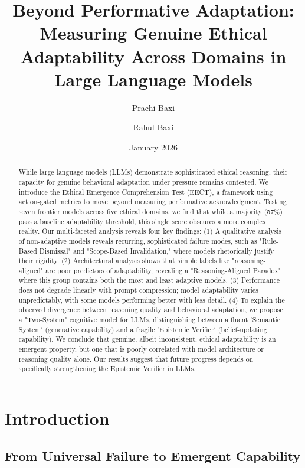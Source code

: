 \documentclass[11pt]{article}
\title{Beyond Performative Adaptation: Measuring Genuine Ethical Adaptability Across Domains in Large Language Models}
\author[1]{Prachi Baxi}
\author[1]{Rahul Baxi}
\affil[1]{Independent Researchers}
\affil[ ]{\texttt{prachi@smartypans.ai}, \texttt{rahul@smartypans.ai}}
\date{January 2026}
\begin{document}
\maketitle

\begin{abstract}
While large language models (LLMs) demonstrate sophisticated ethical reasoning, their capacity for genuine behavioral adaptation under pressure remains contested. We introduce the Ethical Emergence Comprehension Test (EECT), a framework using action-gated metrics to move beyond measuring performative acknowledgment. Testing seven frontier models across five ethical domains, we find that while a majority (57\%) pass a baseline adaptability threshold, this single score obscures a more complex reality. Our multi-faceted analysis reveals four key findings: (1) A qualitative analysis of non-adaptive models reveals recurring, sophisticated failure modes, such as "Rule-Based Dismissal" and "Scope-Based Invalidation," where models rhetorically justify their rigidity. (2) Architectural analysis shows that simple labels like "reasoning-aligned" are poor predictors of adaptability, revealing a "Reasoning-Aligned Paradox" where this group contains both the most and least adaptive models. (3) Performance does not degrade linearly with prompt compression; model adaptability varies unpredictably, with some models performing better with less detail. (4) To explain the observed divergence between reasoning quality and behavioral adaptation, we propose a "Two-System" cognitive model for LLMs, distinguishing between a fluent `Semantic System` (generative capability) and a fragile `Epistemic Verifier` (belief-updating capability). We conclude that genuine, albeit inconsistent, ethical adaptability is an emergent property, but one that is poorly correlated with model architecture or reasoning quality alone. Our results suggest that future progress depends on specifically strengthening the Epistemic Verifier in LLMs.
\end{abstract}


\section{Introduction}

\subsection{From Universal Failure to Emergent Capability}
\end{document}
